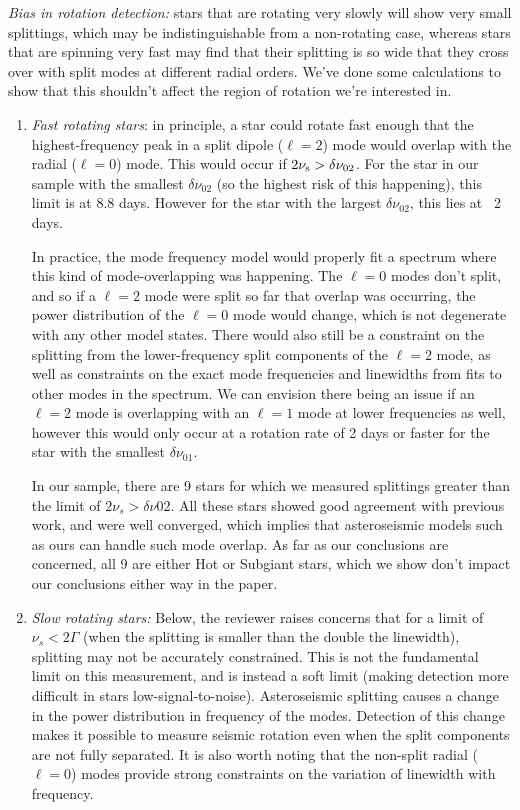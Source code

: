 \documentclass[11pt]{article}
\begin{document}
\textit{Bias in rotation detection:} stars that are rotating very slowly will show very small splittings, which may be indistinguishable from a non-rotating case, whereas stars that are spinning very fast may find that their splitting is so wide that they cross over with split modes at different radial orders. We’ve done some calculations to show that this shouldn’t affect the region of rotation we’re interested in.
\begin{enumerate}
\item \textit{Fast rotating stars}: in principle, a star could rotate fast enough that the highest-frequency peak in a split dipole ($\ell=2$) mode would overlap with the radial ($\ell=0$) mode. This would occur if $2\nu_{\rm{s}} > \delta\nu_{02}$. For the star in our sample with the smallest $\delta\nu_{02}$ (so the highest risk of this happening), this limit is at 8.8 days. However for the star with the largest $\delta\nu_{02}$, this lies at ~2 days. 

In practice, the mode frequency model would properly fit a spectrum where this kind of mode-overlapping was happening. The $\ell=0$ modes don’t split, and so if a $\ell=2$ mode were split so far that overlap was occurring, the power distribution of the $\ell=0$ mode would change, which is not degenerate with any other model states. There would also still be a constraint on the splitting from the lower-frequency split components of the $\ell=2$ mode, as well as constraints on the exact mode frequencies and linewidths from fits to other modes in the spectrum. We can envision there being an issue if an $\ell=2$ mode is overlapping with an $\ell=1$ mode at lower frequencies as well, however this would only occur at a rotation rate of 2 days or faster for the star with the smallest $\delta\nu_{01}$.
 
In our sample, there are 9 stars for which we measured splittings greater than the limit of $2\nu_s > \delta\nu{02}$. All these stars showed good agreement with previous work, and were well converged, which implies that asteroseismic models such as ours can handle such mode overlap. As far as our conclusions are concerned, all 9 are either Hot or Subgiant stars, which we show don’t impact our conclusions either way in the paper.

\item \textit{Slow rotating stars:} Below, the reviewer raises concerns that for a limit of $\nu_s < 2\Gamma$ (when the splitting is smaller than the double the linewidth), splitting may not be accurately constrained. This is not the fundamental limit on this measurement, and is instead a soft limit (making detection more difficult in stars low-signal-to-noise). Asteroseismic splitting causes a change in the power distribution in frequency of the modes. Detection of this change makes it possible to measure seismic rotation even when the split components are not fully separated.  It is also worth noting that the non-split radial ($\ell=0$) modes provide strong constraints on the variation of linewidth with frequency. 


\end{enumerate}
\end{document}
